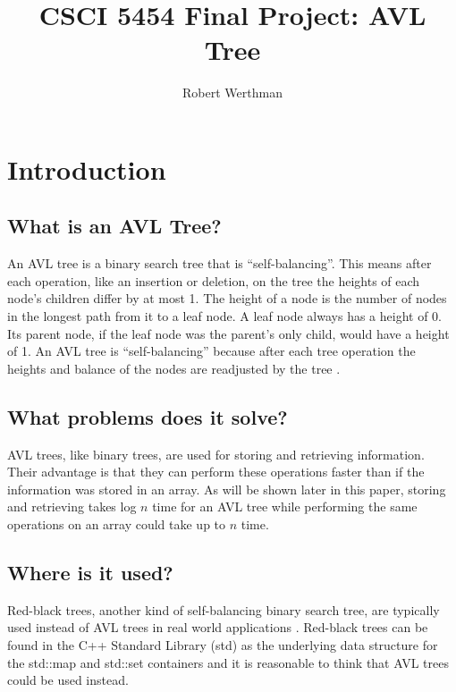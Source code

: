 \documentclass[12pt]{article}
\title{CSCI 5454 Final Project: AVL Tree}
\author{Robert Werthman}
\date{}
\begin{document}
\maketitle

\newpage
\tableofcontents

\newpage
{}
\section*{Introduction}

\subsection*{What is an AVL Tree?}

An AVL tree is a binary search tree that is ``self-balancing''.  This means
after each operation, like an insertion or deletion, on the tree the heights of 
each node's children differ by at most 1.  The height of a node is the number of
nodes in the longest path from it to a leaf node.  A leaf node
always has a height of 0. Its parent node, if the leaf
node was the parent's only child, would have a height of 1.  An AVL tree is
``self-balancing'' because after each tree operation the heights and balance of
the nodes are readjusted by the tree \cite{wiki:avl}.

\subsection*{What problems does it solve?}
AVL trees, like binary trees, are used for storing and retrieving
information.  Their advantage is that they can perform these operations faster
than if the information was stored in an array.  As will be shown later in this
paper, storing and retrieving takes log $n$ time for an AVL tree
while performing the same operations on an array could take up to $n$ time.

\subsection*{Where is it used?}
Red-black trees, another kind of self-balancing binary search tree, are
typically used instead of AVL trees in real world applications
\cite{wiki:red-black}.
Red-black trees can be found in the C++ Standard Library (std) as the underlying data structure
for the std::map and std::set containers and it is reasonable to think that AVL
trees could be used instead.
\end{document}
